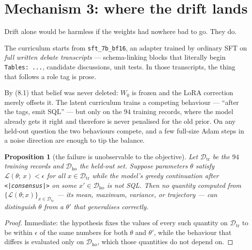 \documentclass[11pt]{article}
\newtheorem{proposition}[theorem]{Proposition}
\theoremstyle{definition}
\begin{document}
\begin{center}
\end{center}

\section{Mechanism 3: where the drift lands}

Drift alone would be harmless if the weights had nowhere bad to go. They do.

The curriculum starts from \texttt{sft\_7b\_bf16}, an adapter trained by ordinary SFT on \emph{full written debate transcripts} --- schema-linking blocks that literally begin \texttt{Tables: ...}, candidate discussions, unit tests. In those transcripts, the thing that follows a role tag is prose.

By (8.1) that belief was never deleted: $W_0$ is frozen and the LoRA correction merely offsets it. The latent curriculum trains a competing behaviour --- ``after the tags, emit SQL'' --- but only on the $94$ training records, where the model already gets it right and therefore is never penalised for the old prior. On any held-out question the two behaviours compete, and a few full-size Adam steps in a noise direction are enough to tip the balance.

\begin{center}
\end{center}

\begin{proposition}[the failure is unobservable to the objective]
Let $\mathcal{D}_{\mathrm{tr}}$ be the $94$ training records and $\mathcal{D}_{\mathrm{ho}}$ the held-out set. Suppose parameters $\theta$ satisfy $\mathcal{L}(\theta;\,x) < \epsilon$ for all $x\in\mathcal{D}_{\mathrm{tr}}$ while the model's greedy continuation after \texttt{<|consensus|>} on some $x'\in\mathcal{D}_{\mathrm{ho}}$ is not SQL. Then no quantity computed from $\{\mathcal{L}(\theta;x)\}_{x\in\mathcal{D}_{\mathrm{tr}}}$ --- its mean, maximum, variance, or trajectory --- can distinguish $\theta$ from a $\theta'$ that generalises correctly.
\end{proposition}
\begin{proof}
Immediate: the hypothesis fixes the values of every such quantity on $\mathcal{D}_{\mathrm{tr}}$ to be within $\epsilon$ of the same numbers for both $\theta$ and $\theta'$, while the behaviour that differs is evaluated only on $\mathcal{D}_{\mathrm{ho}}$, which those quantities do not depend on.
\end{proof}
\end{document}
